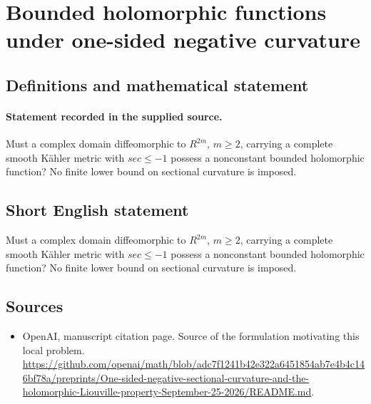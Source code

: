 \documentclass[11pt]{article}
\begin{document}
\section*{Bounded holomorphic functions under one-sided negative curvature}\label{30007152}
\subsection{Definitions and mathematical statement}
\paragraph{Statement recorded in the supplied source.}
Must a complex domain diffeomorphic to $R^{2m}$, $m\geq 2$, carrying a complete smooth Kähler metric with $sec\leq -1$ possess a nonconstant bounded holomorphic function? No finite lower bound on sectional curvature is imposed.
\subsection{Short English statement}
Must a complex domain diffeomorphic to $R^{2m}$, $m\geq 2$, carrying a complete smooth Kähler metric with $sec\leq -1$ possess a nonconstant bounded holomorphic function? No finite lower bound on sectional curvature is imposed.
\subsection{Sources}
\begin{itemize}
\item[S1] OpenAI, manuscript citation page. Source of the formulation motivating this local problem.
\url{https://github.com/openai/math/blob/adc7f1241b42e322a6451854ab7e4b4c146bf78a/preprints/One-sided-negative-sectional-curvature-and-the-holomorphic-Liouville-property-September-25-2026/README.md}.
\end{itemize}
\end{document}
